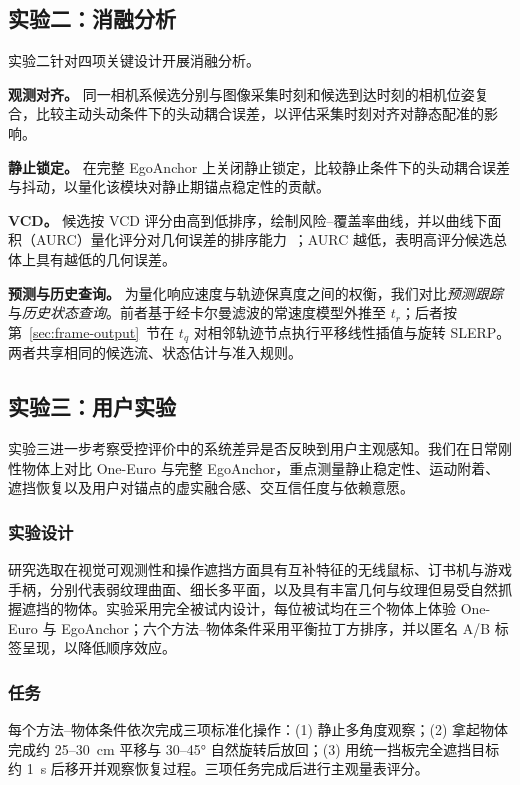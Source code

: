 \documentclass[review]{vgtc}
\begin{document}
\subsection{实验二：消融分析}\label{sec:exp2-design}

实验二针对四项关键设计开展消融分析。

\textbf{观测对齐。}
同一相机系候选分别与图像采集时刻和候选到达时刻的相机位姿复合，比较主动头动条件下的头动耦合误差，以评估采集时刻对齐对静态配准的影响。

\textbf{静止锁定。}
在完整 EgoAnchor 上关闭静止锁定，比较静止条件下的头动耦合误差与抖动，以量化该模块对静止期锚点稳定性的贡献。

\textbf{VCD。}
候选按 VCD 评分由高到低排序，绘制风险--覆盖率曲线，并以曲线下面积（AURC）量化评分对几何误差的排序能力~\cite{riskcontrolled2020,ding2020uncertainty}；AURC 越低，表明高评分候选总体上具有越低的几何误差。

\textbf{预测与历史查询。}
为量化响应速度与轨迹保真度之间的权衡，我们对比\emph{预测跟踪}与\emph{历史状态查询}。前者基于经卡尔曼滤波的常速度模型外推至 $t_r$；后者按第~\ref{sec:frame-output}~节在 $t_q$ 对相邻轨迹节点执行平移线性插值与旋转 SLERP。两者共享相同的候选流、状态估计与准入规则。

\subsection{实验三：用户实验}\label{sec:exp3-design}

实验三进一步考察受控评价中的系统差异是否反映到用户主观感知。我们在日常刚性物体上对比 One-Euro 与完整 EgoAnchor，重点测量静止稳定性、运动附着、遮挡恢复以及用户对锚点的虚实融合感、交互信任度与依赖意愿。

\subsubsection{实验设计}

研究选取在视觉可观测性和操作遮挡方面具有互补特征的无线鼠标、订书机与游戏手柄，分别代表弱纹理曲面、细长多平面，以及具有丰富几何与纹理但易受自然抓握遮挡的物体。实验采用完全被试内设计，每位被试均在三个物体上体验 One-Euro 与 EgoAnchor；六个方法--物体条件采用平衡拉丁方排序，并以匿名 A/B 标签呈现，以降低顺序效应。

\subsubsection{任务}

每个方法--物体条件依次完成三项标准化操作：(1) 静止多角度观察；(2) 拿起物体完成约 25--30~cm 平移与 30--45° 自然旋转后放回；(3) 用统一挡板完全遮挡目标约 1~s 后移开并观察恢复过程。三项任务完成后进行主观量表评分。
\end{document}
